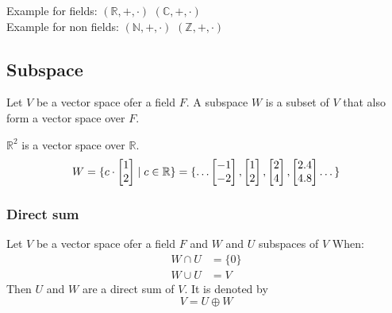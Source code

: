 Example for fields: \((\mathbb{R}, +, \cdot)\) \( (\mathbb{C}, +, \cdot)\) \\
Example for non fields: \((\mathbb{N}, +, \cdot)\) \( (\mathbb{Z}, +, \cdot)\) \\
\subsection{Subspace}
Let \(V\) be a vector space ofer a field \(F\). A subspace \(W\) is a subset of \(V\) that also form a vector space over \(F\).
\begin{example}
    \(\mathbb{R}^2\) is a vector space over \(\mathbb{R}\).
    \begin{align*}
        W = \{c \cdot \begin{bmatrix}
                1 \\2
            \end{bmatrix}
         \mid c \in \mathbb{R} \} = \{ \dots \begin{bmatrix}
            -1 \\ -2
        \end{bmatrix}, \begin{bmatrix}
            1 \\2
        \end{bmatrix}, \begin{bmatrix}
            2 \\4
        \end{bmatrix},\begin{bmatrix}
            2.4 \\ 4.8
        \end{bmatrix} \dots
        \}
    \end{align*}
\end{example}
\subsubsection{Direct sum}
Let \(V\) be a vector space ofer a field \(F\)  and \(W\) and \(U\) subspaces of \(V\)
When:
\begin{align}
    W \cap U & = \{ 0 \} \\
    W \cup U & = V
\end{align}
Then \(U\) and \(W\) are a direct sum of \(V\). It is denoted by
\begin{equation}
    V = U \oplus W
\end{equation}
